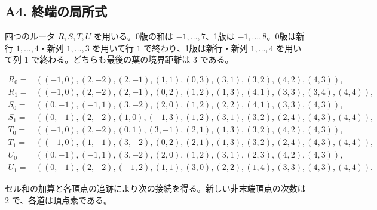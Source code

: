 \documentclass[
  10pt,
  a4paper,
]{article}
\begin{document}
\subsection{A4.
終端の局所式}\label{a4.-ux7d42ux7aefux306eux5c40ux6240ux5f0f}

四つのルータ \(R,S,T,U\) を用いる。0版の和は \(-1,\ldots,7\)、1版は
\(-1,\ldots,8\)。0版は新行 \(1,\ldots,4\)・新列 \(1,\ldots,3\)
を用いて行 \(1\) で終わり、1版は新行・新列 \(1,\ldots,4\) を用いて列
\(1\) で終わる。どちらも最後の葉の境界距離は \(3\) である。

\[
\begin{aligned}
R_0={}&((-1,0),(2,-2),(2,-1),(1,1),(0,3),(3,1),(3,2),(4,2),(4,3)),\\
R_1={}&((-1,0),(2,-2),(2,-1),(0,2),(1,2),(1,3),(4,1),(3,3),(3,4),(4,4)),\\
S_0={}&((0,-1),(-1,1),(3,-2),(2,0),(1,2),(2,2),(4,1),(3,3),(4,3)),\\
S_1={}&((0,-1),(2,-2),(1,0),(-1,3),(1,2),(3,1),(3,2),(2,4),(4,3),(4,4)),\\
T_0={}&((-1,0),(2,-2),(0,1),(3,-1),(2,1),(1,3),(3,2),(4,2),(4,3)),\\
T_1={}&((-1,0),(1,-1),(3,-2),(0,2),(2,1),(1,3),(3,2),(2,4),(4,3),(4,4)),\\
U_0={}&((0,-1),(-1,1),(3,-2),(2,0),(1,2),(3,1),(2,3),(4,2),(4,3)),\\
U_1={}&((0,-1),(2,-2),(-1,2),(1,1),(3,0),(2,2),(1,4),(3,3),(4,3),(4,4)).
\end{aligned}
\]

セル和の加算と各頂点の追跡により次の接続を得る。新しい非末端頂点の次数は
\(2\) で、各道は頂点素である。
\end{document}
